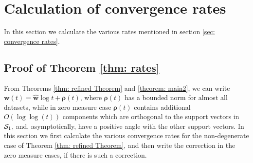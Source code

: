 \documentclass[twoside,11pt,english]{article}
\begin{document}
\newpage
\section{Calculation of convergence rates \label{sec:Calculation-of-convergence rates}}

In this section we calculate the various rates mentioned in section \ref{sec: convergence rates}. 

\subsection{Proof of Theorem \ref{thm: rates}}

From Theorems \ref{thm: refined Theorem} and \ref{theorem: main2}, we can write $\mathbf{w}\left(t\right)=\hat{\mathbf{w}}\log t+\boldsymbol{\rho}\left(t\right)$,
where $\boldsymbol{\rho}\left(t\right)$ has a bounded norm for almost all datasets, while in zero measure case $\boldsymbol{\rho}\left(t\right)$ contains additional  $O(\log\log(t))$ components which are orthogonal to the support vectors in $\mathcal{S}_1$, and, asymptotically, have a positive angle with the other support vectors. In this section we first calculate the various convergence rates for the non-degenerate case of Theorem \ref{thm: refined Theorem}, and then write the correction in the zero measure cases, if there is such a correction.
\end{document}
